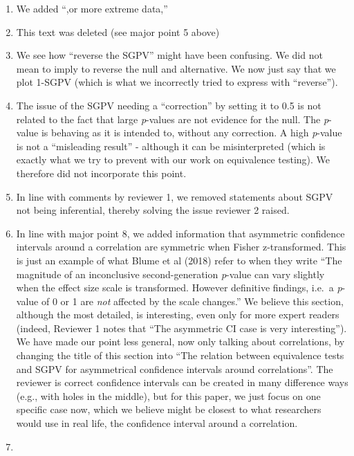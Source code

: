 \documentclass[man]{apa6}
\begin{document}
\begin{enumerate}
\def\labelenumi{\arabic{enumi}.}
\item
  We added \enquote{,or more extreme data,}
\item
  This text was deleted (see major point 5 above)
\item
  We see how \enquote{reverse the SGPV} might have been confusing. We did not mean to imply to reverse the null and alternative. We now just say that we plot 1-SGPV (which is what we incorrectly tried to express with \enquote{reverse}).
\item
  The issue of the SGPV needing a \enquote{correction} by setting it to 0.5 is not related to the fact that large \emph{p}-values are not evidence for the null. The \emph{p}-value is behaving as it is intended to, without any correction. A high \emph{p}-value is not a \enquote{misleading result} - although it can be misinterpreted (which is exactly what we try to prevent with our work on equivalence testing). We therefore did not incorporate this point.
\item
  In line with comments by reviewer 1, we removed statements about SGPV not being inferential, thereby solving the issue reviewer 2 raised.
\item
  In line with major point 8, we added information that asymmetric confidence intervals around a correlation are symmetric when Fisher z-transformed. This is just an example of what Blume et al (2018) refer to when they write \enquote{The magnitude of an inconclusive second-generation \emph{p}-value can vary slightly when the effect size scale is transformed. However definitive findings, i.e.~a \emph{p}-value of 0 or 1 are \emph{not} affected by the scale changes.} We believe this section, although the most detailed, is interesting, even only for more expert readers (indeed, Reviewer 1 notes that \enquote{The asymmetric CI case is very interesting}). We have made our point less general, now only talking about correlations, by changing the title of this section into \enquote{The relation between equivalence tests and SGPV for asymmetrical confidence intervals around correlations}. The reviewer is correct confidence intervals can be created in many difference ways (e.g., with holes in the middle), but for this paper, we just focus on one specific case now, which we believe might be closest to what researchers would use in real life, the confidence interval around a correlation.
\item

\end{enumerate}
\end{document}

